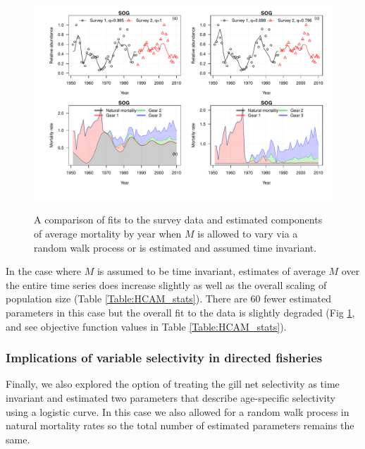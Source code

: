 \begin{figure}[!tbp]
	\includegraphics[width=\textwidth]{../FIGS/iscam_fig_HCAM_qFix_Mfix.pdf}\\
	\caption{A comparison of fits to the survey data and estimated components of average mortality by year when $M$ is allowed to vary via a random walk process or is estimated and assumed time invariant. }\label{fig:qFix_Mfix}
\end{figure}
		
In the case where $M$ is assumed to be time invariant, estimates of average $M$ over the entire time series does increase slightly as well as the overall scaling of population size (Table \ref{Table:HCAM_stats}).  There are 60 fewer estimated parameters in this case but the overall fit to the data is slightly degraded (Fig \ref{fig:qFix_Mfix}, and see objective function values in Table \ref{Table:HCAM_stats}).
		
		\subsubsection{Implications of variable selectivity in directed fisheries}

Finally, we also explored the option of treating the gill net selectivity as time invariant and estimated two parameters that describe age-specific selectivity using a logistic curve.	In this case we also allowed for a random walk  process in natural mortality rates so the total number of estimated parameters remains the same. 

